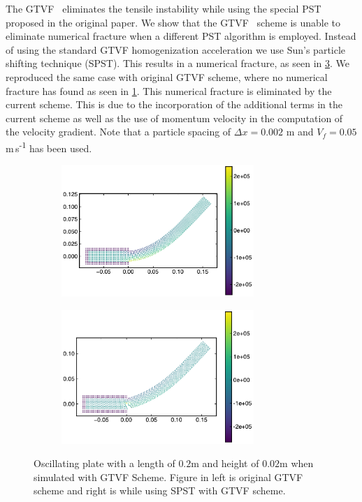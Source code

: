 \documentclass[preprint,12pt]{elsarticle}
\begin{document}
The GTVF~\cite{zhang_hu_adams17} eliminates the tensile instability while
using the special PST proposed in the original paper. We show that the
GTVF~\cite{zhang_hu_adams17} scheme is unable to eliminate numerical fracture
when a different PST algorithm is employed. Instead of using
the standard GTVF homogenization acceleration we use Sun's particle shifting
technique (SPST). This results in a numerical fracture, as seen in
\cref{fig:oscillating-plate:gtvf-sun2019-b}. We reproduced the same case with
original GTVF scheme, where no numerical fracture has found as seen in
\cref{fig:oscillating-plate:gtvf-sun2019-a}. This numerical fracture is
eliminated by the current scheme. This is due to the incorporation of the
additional terms in the current scheme as well as the use of momentum velocity
in the computation of the velocity gradient. Note that a particle spacing of
$\Delta x=0.002$ m and $V_f=0.05$ m\,s\textsuperscript{-1} has been used.

%
%
\begin{figure}[!htpb]
  \centering
  \begin{subfigure}{0.48\textwidth}
    \centering
    \includegraphics[width=0.8\textwidth]{figures/oscillating_plate_gtvf/gtvf_original}
    \subcaption{}%
    \label{fig:oscillating-plate:gtvf-sun2019-a}
  \end{subfigure}
  \begin{subfigure}{0.48\textwidth}
    \centering
    \includegraphics[width=0.8\textwidth]{figures/oscillating_plate/gtvf_sun2019}
    \subcaption{}%
    \label{fig:oscillating-plate:gtvf-sun2019-b}
  \end{subfigure}
\caption{Oscillating plate with a length of $0.2$m and height of $0.02$m when
  simulated with GTVF Scheme. Figure in left is original GTVF scheme and right
  is while using SPST with GTVF scheme.}
\end{figure}
%
\end{document}
